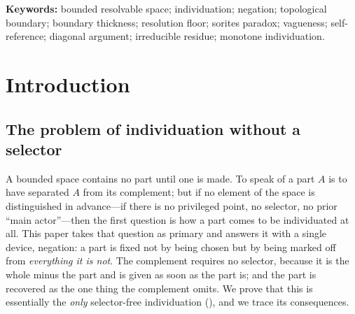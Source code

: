 \documentclass[11pt,twocolumn,a4paper]{article}
\theoremstyle{thmstyle}
\theoremstyle{definition}
\theoremstyle{remark}
\newcommand{\thick}{\beta}
\begin{document}
\begin{abstract}
realisable as a region---which embedding makes natural but which we do not claim
to discharge in general---the irreducible residue is therefore not a locatable set
but a self-referential impossibility that cannot be exhibited, only bounded below
by $\thick$. The positivity of $\thick$ itself is established earlier and
unconditionally. From this we obtain a \emph{Non-Return Theorem}---the count of
committed separations is monotone non-decreasing under every traversal, so no
process returns to a prior individuation state, and resemblance never entails
identity---and an \emph{Inquiry--Cessation Theorem}: thinning a separator
toward zero content has diverging cost and bounded return, so a finite agent
halts at the floor, and knowledge thereafter attaches to bounded wholes and
never to their sub-floor parts. Every claim is proved from stated definitions
and is additionally verified on explicitly constructed instances of the
hypothesis, where an exhaustive numerical check finds every measured quantity in
agreement with the predicted bound; uncertain material has been omitted.
\end{abstract}

\noindent\textbf{Keywords:} bounded resolvable space; individuation;
negation; topological boundary; boundary thickness; resolution floor; sorites
paradox; vagueness; self-reference; diagonal argument; irreducible residue;
monotone individuation.

\tableofcontents

\section{Introduction}
\label{sec:intro}

\subsection{The problem of individuation without a selector}

A bounded space contains no part until one is made. To speak of a part $A$ is
to have separated $A$ from its complement; but if no element of the space is
distinguished in advance---if there is no privileged point, no selector, no
prior ``main actor''---then the first question is how a part comes to be
individuated at all. This paper takes that question as primary and answers it
with a single device, negation: a part is fixed not by being chosen but by
being marked off from \emph{everything it is not}. The complement requires no
selector, because it is the whole minus the part and is given as soon as the
part is; and the part is recovered as the one thing the complement omits. We
prove that this is essentially the \emph{only} selector-free individuation
(), and we trace its consequences.
\end{document}
